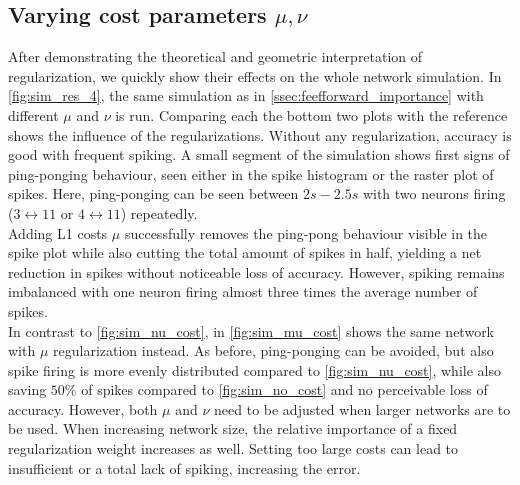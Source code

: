 \subsection{Varying cost parameters $\mu, \nu$}
After demonstrating the theoretical and geometric interpretation of regularization, we quickly show their effects on the whole network simulation. In \cref{fig:sim_res_4}, the same simulation as in \cref{ssec:feefforward_importance} with different $\mu$ and $\nu$ is run. Comparing each the bottom two plots with the reference shows the influence of the regularizations. Without any regularization, accuracy is good with frequent spiking. A small segment of the simulation shows first signs of ping-ponging behaviour, seen either in the spike histogram or the raster plot of spikes. Here, ping-ponging can be seen between $2s-2.5s$ with two neurons firing ($3\longleftrightarrow 11$ or $4\longleftrightarrow 11$) repeatedly.\\
Adding L1 costs $\mu$ successfully removes the ping-pong behaviour visible in the spike plot while also cutting the total amount of spikes in half, yielding a net reduction in spikes without noticeable loss of accuracy. However, spiking remains imbalanced with one neuron firing almost three times the average number of spikes.\\
In contrast to \cref{fig:sim_nu_cost}, in \cref{fig:sim_mu_cost} shows the same network with $\mu$ regularization instead. As before, ping-ponging can be avoided, but also spike firing is more evenly distributed compared to \cref{fig:sim_nu_cost}, while also saving $50\%$ of spikes compared to \cref{fig:sim_no_cost} and no perceivable loss of accuracy. However, both $\mu$ and $\nu$ need to be adjusted when larger networks are to be used. When increasing network size, the relative importance of a fixed regularization weight increases as well. Setting too large costs can lead to insufficient or a total lack of spiking, increasing the error.
